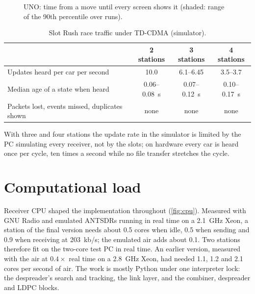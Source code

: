 \documentclass[11pt,a4paper,oneside]{report}
\begin{document}
\begin{figure}[htbp]
\centering
{}
\caption{UNO: time from a move until every screen shows it (shaded: range of the 90th percentile over runs).}\label{fig:uno}
\end{figure}

\begin{table}[htbp]
\centering\small
\caption{Slot Rush race traffic under TD-CDMA (simulator).}\label{tab:race}
\begin{tabular}{@{}lccc@{}}
\toprule
 & \textbf{2 stations} & \textbf{3 stations} & \textbf{4 stations}\\
\midrule
Updates heard per car per second & 10.0 & 6.1--6.45 & 3.5--3.7\\
Median age of a state when heard & 0.06--\SI{0.08}{s} & 0.07--\SI{0.12}{s} & 0.10--\SI{0.17}{s}\\
Packets lost, events missed, duplicates shown & none & none & none\\
\bottomrule
\end{tabular}
\end{table}

With three and four stations the update rate in the simulator is limited by the PC simulating every
receiver, not by the slots; on hardware every car is heard once per cycle, ten times a second while no
file transfer stretches the cycle.

\section{Computational load}\label{sec:cpu}
Receiver CPU shaped the implementation throughout (\cref{fig:cpu}). Measured with GNU Radio and emulated
ANTSDRs running in real time on a \SI{2.1}{GHz} Xeon, a station of the final version needs about 0.5
cores when idle, 0.5 when sending and 0.9 when receiving at \SI{203}{kb/s}; the emulated air adds about
0.1. Two stations therefore fit on the two-core test PC in real time. An earlier version, measured with
the air at $0.4\times$ real time on a \SI{2.8}{GHz} Xeon, had needed 1.1, 1.2 and 2.1 cores per second of
air. The work is mostly Python under one interpreter lock: the despreader's search and tracking, the
link layer, and the combiner, despreader and LDPC blocks.
\end{document}
